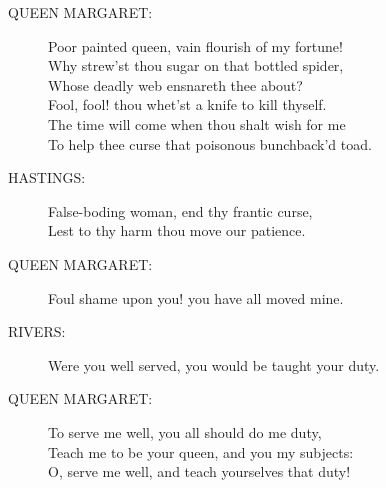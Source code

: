 \documentclass{article}
\begin{document}
\begin{description}
\item[QUEEN MARGARET:] 
\hspace{1pt}Poor painted queen, vain flourish of my fortune!\\
\hspace{1pt}Why strew'st thou sugar on that bottled spider,\\
\hspace{1pt}Whose deadly web ensnareth thee about?\\
\hspace{1pt}Fool, fool! thou whet'st a knife to kill thyself.\\
\hspace{1pt}The time will come when thou shalt wish for me\\
\hspace{1pt}To help thee curse that poisonous bunchback'd toad.\\
\end{description}
\begin{description}
\item[HASTINGS:] 
\hspace{1pt}False-boding woman, end thy frantic curse,\\
\hspace{1pt}Lest to thy harm thou move our patience.\\
\end{description}
\begin{description}
\item[QUEEN MARGARET:] 
\hspace{1pt}Foul shame upon you! you have all moved mine.\\
\end{description}
\begin{description}
\item[RIVERS:] 
\hspace{1pt}Were you well served, you would be taught your duty.\\
\end{description}
\begin{description}
\item[QUEEN MARGARET:] 
\hspace{1pt}To serve me well, you all should do me duty,\\
\hspace{1pt}Teach me to be your queen, and you my subjects:\\
\hspace{1pt}O, serve me well, and teach yourselves that duty!\\
\end{description}
\end{document}
